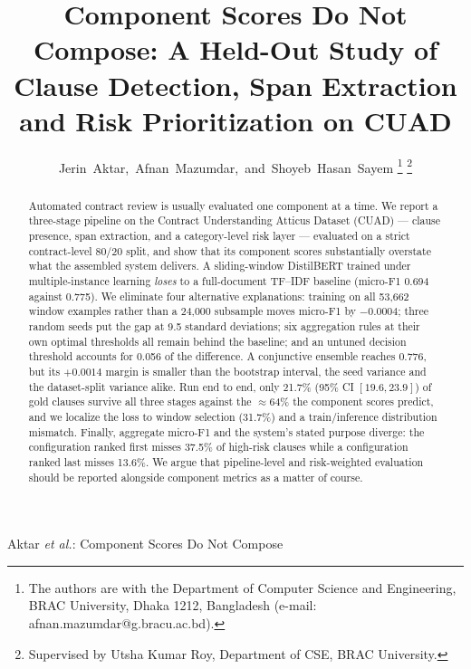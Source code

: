 \documentclass[journal,a4paper]{IEEEtran}
\begin{document}
\title{Component Scores Do Not Compose: A Held-Out Study of\\
Clause Detection, Span Extraction and Risk Prioritization on CUAD}

\author{Jerin~Aktar,~Afnan~Mazumdar,~and~Shoyeb~Hasan~Sayem
\thanks{The authors are with the Department of Computer Science and Engineering,
BRAC University, Dhaka 1212, Bangladesh (e-mail: afnan.mazumdar@g.bracu.ac.bd).}
\thanks{Supervised by Utsha Kumar Roy, Department of CSE, BRAC University.}}

%
{Aktar \MakeLowercase{\textit{et al.}}: Component Scores Do Not Compose}

\maketitle

\begin{abstract}
Automated contract review is usually evaluated one component at a time. We report a
three-stage pipeline on the Contract Understanding Atticus Dataset (CUAD) --- clause
presence, span extraction, and a category-level risk layer --- evaluated on a strict
contract-level 80/20 split, and show that its component scores substantially overstate
what the assembled system delivers. A sliding-window DistilBERT trained under multiple-instance
learning \emph{loses} to a full-document TF--IDF baseline (micro-F1 0.694 against 0.775).
We eliminate four alternative explanations: training on all 53{,}662 window examples rather
than a 24{,}000 subsample moves micro-F1 by $-0.0004$; three random seeds put the gap at 9.5
standard deviations; six aggregation rules at their own optimal thresholds all remain behind
the baseline; and an untuned decision threshold accounts for 0.056 of the difference. A
conjunctive ensemble reaches 0.776, but its $+0.0014$ margin is smaller than the bootstrap
interval, the seed variance and the dataset-split variance alike. Run end to end, only
21.7\% (95\% CI $[19.6, 23.9]$) of gold clauses survive all three stages against the
$\approx$64\% the component scores predict, and we localize the loss to window selection
(31.7\%) and a train/inference distribution mismatch. Finally, aggregate micro-F1 and the
system's stated purpose diverge: the configuration ranked first misses 37.5\% of high-risk
clauses while a configuration ranked last misses 13.6\%. We argue that pipeline-level and
risk-weighted evaluation should be reported alongside component metrics as a matter of course.
\end{abstract}
\end{document}
